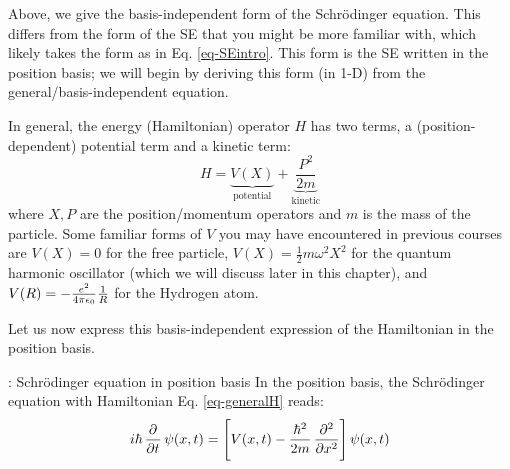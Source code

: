 Above, we give the basis-independent form of the Schr\"{o}dinger equation. This differs from the form of the SE that you might be more familiar with, which likely takes the form as in Eq. \eqref{eq-SEintro}. This form is the SE written in the position basis; we will begin by deriving this form (in 1-D) from the general/basis-independent equation.

In general, the energy (Hamiltonian) operator $H$ has two terms, a (position-dependent) potential term and a kinetic term:
\begin{equation}\label{eq-generalH}
    H = \underbrace{V(X)}_{\text{potential}} + \underbrace{\frac{P^2}{2m}}_{\text{kinetic}}
\end{equation}
where $X, P$ are the position/momentum operators and $m$ is the mass of the particle. Some familiar forms of $V$ you may have encountered in previous courses are $V(X) = 0$ for the free particle, $V(X) = \frac{1}{2}m\omega^2X^2$ for the quantum harmonic oscillator (which we will discuss later in this chapter), and $V(R) = -\frac{e^2}{4\pi \epsilon_0}\frac{1}{R}$ for the Hydrogen atom.

Let us now express this basis-independent expression of the Hamiltonian in the position basis. 

\begin{propbox}{: Schr\"{o}dinger equation in position basis}
    In the position basis, the Schr\"{o}dinger equation with Hamiltonian Eq. \eqref{eq-generalH} reads:
    \begin{equation}\label{eq-SEpositionbasis}
        i\hbar\dpd{}{t}\psi(x, t) = \left[V(x, t) -\frac{\hbar^2}{2m}\dpd[2]{}{x}\right]\psi(x, t)
    \end{equation}
\end{propbox}

